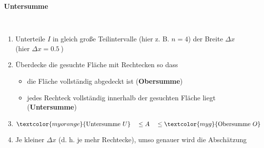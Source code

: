 \begin{solution}{}
\begin{itemize}[leftmargin=*]
{\begin{minipage}[t]{0.85\linewidth}
\begin{minipage}[t]{0.40\linewidth}
{
                    }
                    \textcolor{myorange}{\textbf{Untersumme}}
                \end{minipage}\\[1.0ex]
                \begin{enumerate}[leftmargin=*, label=\Roman*)]
                    \item Unterteile $I$ in gleich große Teilintervalle (hier z. B. $n = 4$) der Breite $\Delta x$ (hier $\Delta x = \SI{0.5}{}$)
                    \item Überdecke die gesuchte Fläche mit Rechtecken so dass \\[-2.0ex]{
                        \begin{itemize}[leftmargin=*]
                            \item \textcolor{myg}{die Fläche vollständig abgedeckt ist (\textbf{Obersumme})}
                            \item \textcolor{myorange}{jedes Rechteck vollständig innerhalb der gesuchten Fläche liegt (\textbf{Untersumme})}
                        \end{itemize}
                        }
                    \item $\textcolor{myorange}{\text{Untersumme} \ U} \quad \leq A \quad \leq \textcolor{myg}{\text{Obersumme} \ O}$
                    \item Je kleiner $\Delta x$ (d. h. je mehr Rechtecke), umso genauer wird die Abschätzung
                \end{enumerate}
            \end{minipage}
            }
    \end{itemize}

\end{solution}
